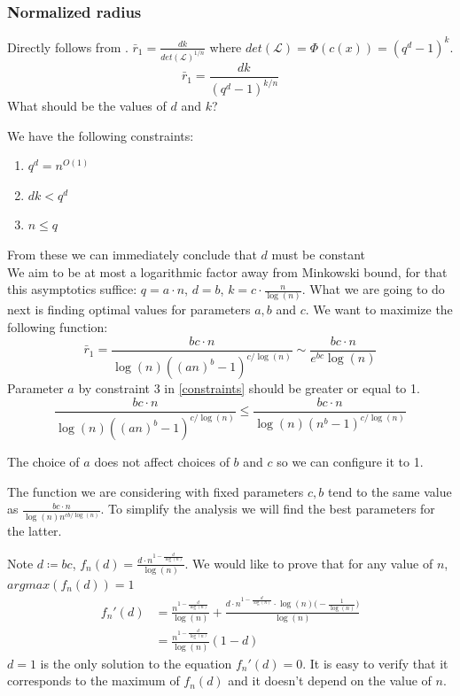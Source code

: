 \documentclass[12pt]{article}
\begin{document}
\subsubsection{Normalized radius}
\label{subsubsec:normalized_discrete_error}
Directly follows from \cite{[DP19]}. $\bar{r}_1 = \frac{dk}{det(\mathcal{L})^{1/n}}$ where $det(\mathcal{L}) = \Phi(c(x)) = (q^{d} - 1)^{k}$.
\[
\bar{r}_1 = \frac{dk}{(q^{d} - 1)^{k/n}}
\]
What should be the values of $d$ and $k$?

We have the following constraints:
\begin{enumerate}\label{constraints}
    \item $q^d = n^{O(1)}$
    \item $dk < q^{d}$
    \item $n \leq q$
\end{enumerate}
From these we can immediately conclude that $d$ must be constant \\

We aim to be at most a logarithmic factor away from Minkowski bound, for that this asymptotics suffice: $q = a \cdot n$, $d = b$, $k =  c \cdot \frac{n}{\log(n)}$. What we are going to do next is finding optimal values for parameters $a, b$ and $c$. We want to maximize the following function:
\[
\bar{r}_1 = \frac{bc \cdot n}{\log(n)((an)^{b} - 1)^{c/\log(n)}}  \sim \frac{bc \cdot n}{e^{bc}\log(n)}
\]
 Parameter $a$ by constraint 3 in \ref{constraints} should be greater or equal to 1.
 \[
    \frac{bc \cdot n}{\log(n)((an)^{b} - 1)^{c/\log(n)}} \leq \frac{bc \cdot n}{\log(n)(n^{b} - 1)^{c/\log(n)}}
 \]

The choice of $a$ does not affect choices of $b$ and $c$ so we can configure it to 1.

The function we are considering with fixed parameters $c, b$ tend to the same value as $\frac{bc \cdot n}{\log(n)n^{cb/\log(n)}}$. To simplify the analysis we will find the best parameters for the latter.

Note $d \coloneqq bc$, $f_n(d) = \frac{d \cdot n^{1 - \frac{d}
{\log(n)} }}{\log(n)}$.
We would like to prove that for any value of $n$, $argmax(f_n(d)) = 1$
\[
\begin{split}
    f_n'(d) & = \frac{n^{1 - \frac{d}
    {\log(n)}}}{\log(n)} + \frac{d \cdot n^{1 - \frac{d}
    {\log(n)}} \cdot \log(n) \big(-\frac{1}{\log(n)}\big)}{\log(n)} \\
    & = \frac{n^{1 - \frac{d}{\log(n)}}}{\log(n)}(1-d)
\end{split}
\]
$d = 1$ is the only solution to the equation $f_n'(d) = 0$. It is easy to verify that it corresponds to the maximum of $f_n(d)$ and it doesn't depend on the value of $n$.
\end{document}
